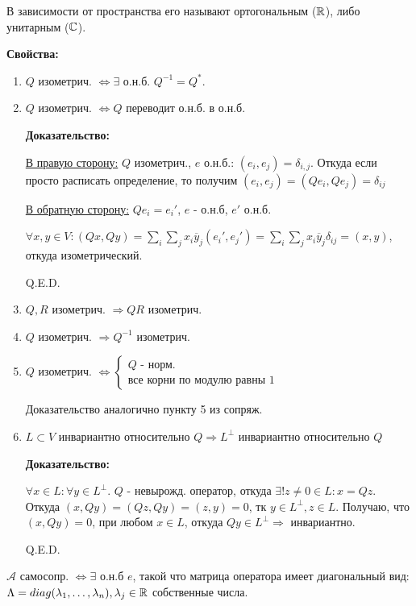 В зависимости от пространства его называют ортогональным ($\mathbb{R}$), либо унитарным ($\mathbb{C}$).

\textbf{Свойства:}

\begin{enumerate}
    \item $Q$ изометрич. $\Leftrightarrow \exists $ о.н.б. $Q^{-1}=Q^*$.
    \item $Q$ изометрич. $\Leftrightarrow Q$ переводит о.н.б. в о.н.б.

    \textbf{Доказательство:}

    \uline{В правую сторону:} $Q$ изометрич., $e$ о.н.б.: $(e_i,e_j) = \delta_{i,j}$. Откуда если просто расписать определение, то получим $(e_i,e_j) = (Q e_i,Qe_j) = \delta_{ij}$

    \uline{В обратную сторону:} $Qe_i = e_i'$, $e$ - о.н.б, $e'$ о.н.б.

    $\forall x,y \in V: (Qx,Qy) = \sum\limits_{i}\sum\limits_{j}x_i\overline{y}_j (e_i',e_j') = \sum\limits_{i}\sum\limits_{j}x_i\overline{y}_j \delta_{ij}= (x,y)$, откуда изометрический.

    \hfill Q.E.D.

    \item $Q,R$ изометрич. $\Rightarrow QR$ изометрич.
    \item $Q$ изометрич. $\Rightarrow Q^{-1}$ изометрич.
    \item $Q$ изометрич. $\Leftrightarrow \begin{cases}
        Q \text{ - норм.}\\
        \text{все корни по модулю равны 1}
    \end{cases}$

    Доказательство аналогично пункту 5 из сопряж.
    \item  $L \subset V$ инвариантно относительно $Q \Rightarrow L^\perp$ инвариантно относительно $Q$

    \textbf{Доказательство:}

    $\forall x\in L: \forall y \in L^\perp$. $Q$ - невырожд. оператор, откуда $\exists! z\neq 0 \in L:x = Qz$. Откуда $(x, Qy) = (Qz, Qy ) = (z,y) = 0$, тк $y \in L^\perp, z \in L$. Получаю, что $(x,Qy) = 0$, при любом $x\in L$, откуда $Qy \in L^\perp \Rightarrow$ инвариантно.



    \hfill Q.E.D.
\end{enumerate}

$\mathcal{A}$ самосопр. $\Leftrightarrow \exists$ о.н.б $e$, такой что матрица оператора имеет  диагональный вид: $\Lambda =  diag(\lambda_1,\ldots,\lambda_n), \lambda_j\in\mathbb{R}$ собственные числа.

